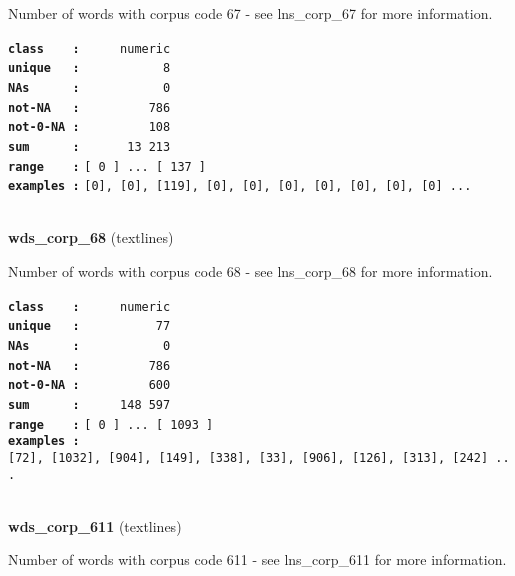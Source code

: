 \documentclass[]{article}
\begin{document}
Number of words with corpus code 67 - see lns\_corp\_67 for more
information.

\textbf{\texttt{class\ \ \ \ :}} \texttt{~~~~~numeric}\\
\textbf{\texttt{unique\ \ \ :}} \texttt{~~~~~~~~~~~8}\\
\textbf{\texttt{NAs\ \ \ \ \ \ :}} \texttt{~~~~~~~~~~~0}\\
\textbf{\texttt{not-NA\ \ \ :}} \texttt{~~~~~~~~~786}\\
\textbf{\texttt{not-0-NA\ :}} \texttt{~~~~~~~~~108}\\
\textbf{\texttt{sum\ \ \ \ \ \ :}} \texttt{~~~~~~13~213}\\
\textbf{\texttt{range\ \ \ \ :}}
\texttt{{[}\ 0\ {]}\ ...\ {[}\ 137\ {]}}\\
\textbf{\texttt{examples\ :}}
\texttt{{[}0{]},\ {[}0{]},\ {[}119{]},\ {[}0{]},\ {[}0{]},\ {[}0{]},\ {[}0{]},\ {[}0{]},\ {[}0{]},\ {[}0{]}\ ...}\\

~

\textbf{wds\_corp\_68} (textlines)

Number of words with corpus code 68 - see lns\_corp\_68 for more
information.

\textbf{\texttt{class\ \ \ \ :}} \texttt{~~~~~numeric}\\
\textbf{\texttt{unique\ \ \ :}} \texttt{~~~~~~~~~~77}\\
\textbf{\texttt{NAs\ \ \ \ \ \ :}} \texttt{~~~~~~~~~~~0}\\
\textbf{\texttt{not-NA\ \ \ :}} \texttt{~~~~~~~~~786}\\
\textbf{\texttt{not-0-NA\ :}} \texttt{~~~~~~~~~600}\\
\textbf{\texttt{sum\ \ \ \ \ \ :}} \texttt{~~~~~148~597}\\
\textbf{\texttt{range\ \ \ \ :}}
\texttt{{[}\ 0\ {]}\ ...\ {[}\ 1093\ {]}}\\
\textbf{\texttt{examples\ :}}
\texttt{{[}72{]},\ {[}1032{]},\ {[}904{]},\ {[}149{]},\ {[}338{]},\ {[}33{]},\ {[}906{]},\ {[}126{]},\ {[}313{]},\ {[}242{]}\ ...}\\

~

\textbf{wds\_corp\_611} (textlines)

Number of words with corpus code 611 - see lns\_corp\_611 for more
information.
\end{document}
